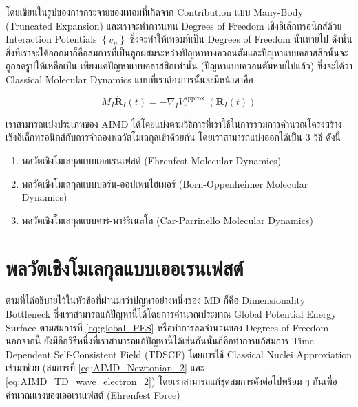 \noindent โดยเขียนในรูปของการกระจายของเทอมที่เกิดจาก Contribution แบบ Many-Body (Truncated Expansion) และเราจะทำการแทน
Degrees of Freedom เชิงอิเล็กทรอนิกส์ด้วย Interaction Potentials $\left\{v_n\right\}$ ซึ่งจะทำให้เทอมที่เป็น Degrees of
Freedom นั้นหายไป ดังนั้นสิ่งที่เราจะได้ออกมาก็คือสมการที่เป็นลูกผสมระหว่างปัญหาทางควอนตัมและปัญหาแบบคลาสสิกนั้นจะถูกลดรูปให้เหลือเป็น%
เพียงแค่ปัญหาแบบคลาสสิกเท่านั้น (ปัญหาแบบควอนตัมหายไปแล้ว) ซึ่งจะได้ว่า Classical Molecular Dynamics แบบที่เราต้องการนั้นจะมีหน้าตาคือ

\begin{equation}
  M_I \ddot{\mathbf{R}}_I(t)
  =
  -\nabla_I V_{\mathrm{e}}^{\text {approx }}\left(\mathbf{R}_I(t)\right)
\end{equation}

เราสามารถแบ่งประเภทของ AIMD ได้โดยแบ่งตามวิธีการที่เราใช้ในการรวมการคำนวณโครงสร้างเชิงอิเล็กทรอนิกส์กับการจำลองพลวัตโมเลกุลเข้าด้วยกัน
โดยเราสามารถแบ่งออกได้เป็น 3 วิธี ดังนี้

\begin{enumerate}[topsep=0pt,noitemsep]
  \setlength\itemsep{1em}
  \item พลวัตเชิงโมเลกุลแบบเออเรนเฟสต์ (Ehrenfest Molecular Dynamics)

  \item พลวัตเชิงโมเลกุลแบบบอร์น-ออปเพนไฮเมอร์ (Born-Oppenheimer Molecular Dynamics)

  \item พลวัตเชิงโมเลกุลแบบคาร์-พาร์ริเนลโล (Car-Parrinello Molecular Dynamics)
\end{enumerate}

\section{พลวัตเชิงโมเลกุลแบบเออเรนเฟสต์}

ตามที่ได้อธิบายไว้ในหัวข้อที่ผ่านมาว่าปัญหาอย่างหนึ่งของ MD ก็คือ Dimensionality Bottleneck ซึ่งเราสามารถแก้ปัญหานี้ได้โดยการคำนวณประมาณ
Global Potential Energy Surface ตามสมการที่ \eqref{eq:global_PES} หรือทำการลดจำนวนของ Degrees of Freedom นอกจากนี้
ยังมีอีกวิธีหนึ่งที่เราสามารถแก้ปัญหานี้ได้เช่นกันนั่นก็คือทำการแก้สมการ Time-Dependent Self-Consistent Field (TDSCF) โดยการใช้
Classical Nuclei Approxiation เข้ามาช่วย (สมการที่ \eqref{eq:AIMD_Newtonian_2} และ \eqref{eq:AIMD_TD_wave_electron_2})
โดยเราสามารถแก้ชุดสมการดังต่อไปพร้อม ๆ กันเพื่อคำนวณแรงของเออเรนเฟสต์ (Ehrenfest Force)

